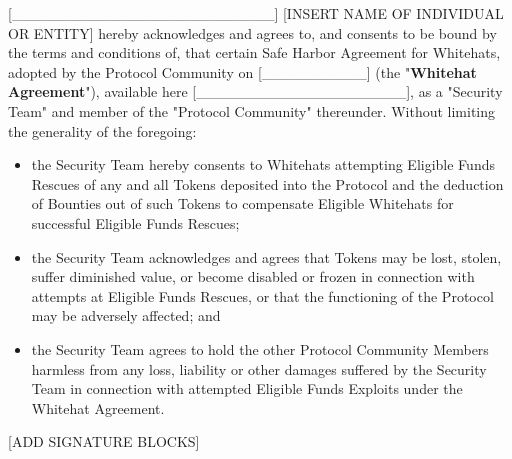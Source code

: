 [\_\_\_\_\_\_\_\_\_\_\_\_\_\_\_\_\_\_\_\_\_\_\_\_\_] [INSERT NAME OF INDIVIDUAL OR ENTITY] hereby acknowledges and agrees to, and consents to be bound by the terms and conditions of, that certain Safe Harbor Agreement for Whitehats, adopted by the Protocol Community on [\_\_\_\_\_\_\_\_\_\_] (the "\textbf{Whitehat Agreement}"), available here [\_\_\_\_\_\_\_\_\_\_\_\_\_\_\_\_\_\_\_\_], as a "Security Team" and member of the "Protocol Community" thereunder. Without limiting the generality of the foregoing:

\begin{itemize}
    \item the Security Team hereby consents to Whitehats attempting Eligible Funds Rescues of any and all Tokens deposited into the Protocol and the deduction of Bounties out of such Tokens to compensate Eligible Whitehats for successful Eligible Funds Rescues;

    \item the Security Team acknowledges and agrees that Tokens may be lost, stolen, suffer diminished value, or become disabled or frozen in connection with attempts at Eligible Funds Rescues, or that the functioning of the Protocol may be adversely affected; and

    \item the Security Team agrees to hold the other Protocol Community Members harmless from any loss, liability or other damages suffered by the Security Team in connection with attempted Eligible Funds Exploits under the Whitehat Agreement.
\end{itemize}


[ADD SIGNATURE BLOCKS]